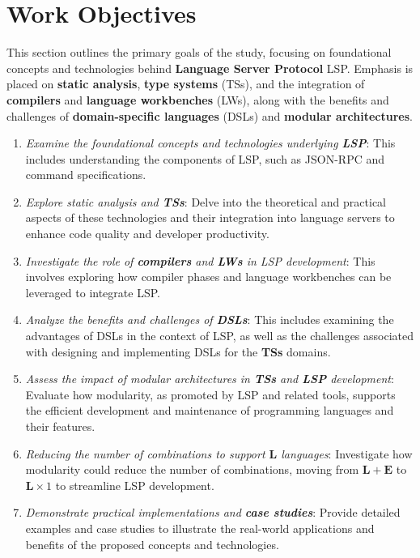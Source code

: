 \documentclass{adapt-lab}
\begin{document}
\section{Work Objectives}

This section outlines the primary goals of the study, focusing on foundational concepts and technologies behind \textbf{Language Server Protocol} LSP. Emphasis is placed on \textbf{static analysis}, \textbf{type systems} (TSs), and the integration of \textbf{compilers} and \textbf{language workbenches} (LWs), along with the benefits and challenges of \textbf{domain-specific languages} (DSLs) and \textbf{modular architectures}.

\begin{enumerate}
    \item \textit{Examine the foundational concepts and technologies underlying \textbf{LSP}}: This includes understanding the components of LSP, such as JSON-RPC and command specifications.

    \item \textit{Explore static analysis and \textbf{TSs}}: Delve into the theoretical and practical aspects of these technologies and their integration into language servers to enhance code quality and developer productivity.

    \item \textit{Investigate the role of \textbf{compilers} and \textbf{LWs} in LSP development}: This involves exploring how compiler phases and language workbenches can be leveraged to integrate LSP.

    \item \textit{Analyze the benefits and challenges of \textbf{DSLs}}: This includes examining the advantages of DSLs in the context of LSP, as well as the challenges associated with designing and implementing DSLs for the \textbf{TSs} domains.

    \item \textit{Assess the impact of modular architectures in \textbf{TSs} and \textbf{LSP} development}: Evaluate how modularity, as promoted by LSP and related tools, supports the efficient development and maintenance of programming languages and their features.

    \item \textit{Reducing the number of combinations to support $\mathbf{L}$ languages}: Investigate how modularity could reduce the number of combinations, moving from $\mathbf{L} + \mathbf{E}$ to $\mathbf{L} \times 1$ to streamline LSP development.

    \item \textit{Demonstrate practical implementations and \textbf{case studies}}: Provide detailed examples and case studies to illustrate the real-world applications and benefits of the proposed concepts and technologies.
\end{enumerate}
\end{document}
